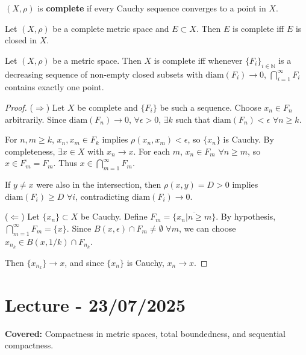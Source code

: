 \documentclass{functionspaces}
\begin{document}
\begin{definition}
$(X,\rho)$ is \textbf{complete} if every Cauchy sequence converges to a point in $X$.
\end{definition}

\begin{proposition}
Let $(X,\rho)$ be a complete metric space and $E \subset X$. Then $E$ is complete iff $E$ is closed in $X$.
\end{proposition}

\begin{theorem}
Let $(X,\rho)$ be a metric space. Then $X$ is complete iff whenever $\{F_i\}_{i\in\mathbb{N}}$ is a decreasing sequence of non-empty closed subsets with $\text{diam}(F_i) \to 0$, $\bigcap_{i=1}^\infty F_i$ contains exactly one point.
\end{theorem}

\begin{proof}
($\Rightarrow$) Let $X$ be complete and $\{F_i\}$ be such a sequence. Choose $x_n \in F_n$ arbitrarily. Since $\text{diam}(F_n) \to 0$, $\forall \epsilon > 0$, $\exists k$ such that $\text{diam}(F_n) < \epsilon$ $\forall n \geq k$.

For $n,m \geq k$, $x_n,x_m \in F_k$ implies $\rho(x_n,x_m) < \epsilon$, so $\{x_n\}$ is Cauchy. By completeness, $\exists x \in X$ with $x_n \to x$. For each $m$, $x_n \in F_m$ $\forall n \geq m$, so $x \in \overline{F_m} = F_m$. Thus $x \in \bigcap_{m=1}^\infty F_m$.

If $y \neq x$ were also in the intersection, then $\rho(x,y) = D > 0$ implies $\text{diam}(F_i) \geq D$ $\forall i$, contradicting $\text{diam}(F_i) \to 0$.

($\Leftarrow$) Let $\{x_n\} \subset X$ be Cauchy. Define $F_m = \overline{\{x_n | n \geq m\}}$. By hypothesis, $\bigcap_{m=1}^\infty F_m = \{x\}$. Since $B(x,\epsilon) \cap F_m \neq \emptyset$ $\forall m$, we can choose $x_{n_k} \in B(x,1/k) \cap F_{n_k}$.

Then $\{x_{n_k}\} \to x$, and since $\{x_n\}$ is Cauchy, $x_n \to x$.
\end{proof}

\endgroup


\newpage
\section{Lecture - 23/07/2025}

\textbf{Covered:} Compactness in metric spaces, total boundedness, and sequential compactness.
\end{document}
